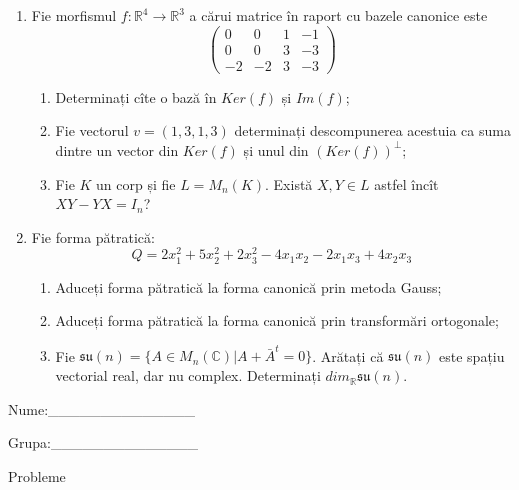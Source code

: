 \documentclass{article}
\begin{document}
\begin{enumerate}
 \item Fie morfismul $f:\mathbb{R}^4 \to \mathbb{R}^3$ a cărui matrice în raport cu bazele canonice este
$$\begin{pmatrix}
0&0&1&-1\\
0&0&3&-3\\
-2&-2&3&-3
\end{pmatrix}$$

\begin{enumerate}
\item Determinați cîte o bază în $Ker(f)$ și $Im(f)$;
\item Fie vectorul $v=(1,3,1,3)$ determinați descompunerea acestuia ca suma dintre un vector din $Ker(f)$ și unul din $(Ker(f))^\perp$;
\item Fie $K$ un corp și fie $L=M_n(K)$. Există $X,Y \in L$ astfel încît $XY-YX=I_n$?  
\end{enumerate}
\item Fie forma pătratică:
$$Q= 2x_1^2+5x_2^2+2x_3^2-4x_1x_2-2x_1x_3+4x_2x_3$$

\begin{enumerate}
\item Aduceți forma pătratică la forma canonică prin metoda Gauss;
\item Aduceți forma pătratică la forma canonică prin transformări ortogonale;
\item Fie $\mathfrak{su}(n)=\{ A \in M_n(\mathbb{C}) | A+\bar{A}^t=0\}$. Arătați că $\mathfrak{su}(n)$ este spațiu vectorial real, dar nu complex.
Determinați $dim_{\mathbb{R}}\mathfrak{su}(n)$.
\end{enumerate}
\end{enumerate}
\newpage
\begin{flushright}
Nume:\_\_\_\_\_\_\_\_\_\_\_\_\_\_
 
 
Grupa:\_\_\_\_\_\_\_\_\_\_\_\_\_\_
\end{flushright}
\begin{center}
\vspace{2cm}
{\Large Probleme}
\vspace{2cm}
\end{center}
\end{document}
